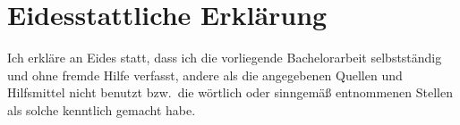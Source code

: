 
\chapter*{Eidesstattliche Erklärung}

Ich erkläre an Eides statt, dass ich die vorliegende Bachelorarbeit selbstständig und ohne fremde Hilfe verfasst, andere als die angegebenen Quellen und Hilfsmittel nicht benutzt bzw.~die wörtlich oder sinngemäß entnommenen Stellen als solche kenntlich gemacht habe.

\vspace{3.5\baselineskip}
\signaffidavit[]